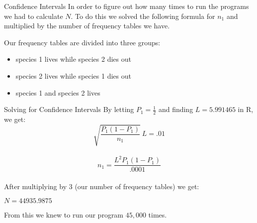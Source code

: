 \begin{frame}{Confidence Intervals}
In order to figure out how many times to run the programs we had to calculate $N$. To do this we solved the following formula for $n_1$ and multiplied by the number of frequency tables we have.

\vfill

Our frequency tables are divided into three groups:
\begin{itemize}
	\item species 1 lives while species 2 dies out
	\item species 2 lives while species 1 dies out
	\item species 1 and species 2 lives
\end{itemize}

\vfill 

\end{frame}

\begin{frame}{Solving for Confidence Intervals}
By letting $P_1 = \frac{1}{2}$ and finding $L = 5.991465$ in R, we get:\\

$$\sqrt{\frac{P_1 (1-P_1)}{n_1}} \ L = .01$$ \\
$$n_1 = \frac{L^2 P_1 (1-P_1)}{.0001}$$ \\
After multiplying by $3$ (our number of frequency tables) we get: \\
\begin{center} 
$N = 44935.9875$ 
\end{center} 

From this we knew to run our program $45,000$ times. 
\end{frame}


